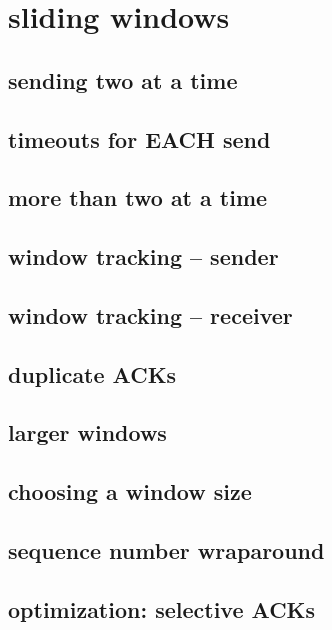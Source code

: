 \section{sliding windows}

\subsection{sending two at a time}


\subsection{timeouts for EACH send}


\subsection{more than two at a time}


\subsection{window tracking -- sender}


\subsection{window tracking -- receiver}
%

\subsection{duplicate ACKs}


\subsection{larger windows}

\subsection{choosing a window size}

\subsection{sequence number wraparound}

\subsection{optimization: selective ACKs}

